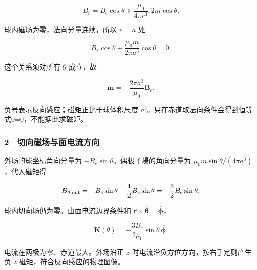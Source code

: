\documentclass[12pt,a4paper,fontset=fandol]{ctexart}
\begin{document}
\[B_r=B_e\cos\theta+\frac{\mu_0}{4\pi r^3},2m\cos\theta.\]

球内磁场为零，法向分量连续，所以 \(r=a\) 处

\[B_e\cos\theta+\frac{\mu_0m}{2\pi a^3}\cos\theta=0.\]

这个关系须对所有 \(\theta\) 成立，故

\[\boxed{\boldsymbol m=-\frac{2\pi a^3}{\mu_0}\boldsymbol B_e.}\]

负号表示反向感应；磁矩正比于球体积尺度
\(a^3\)。只在赤道取法向条件会得到恒等式0=0，不能据此求磁矩。

\subsubsection{2　切向磁场与面电流方向}\label{ux5207ux5411ux78c1ux573aux4e0eux9762ux7535ux6d41ux65b9ux5411}

外场的球坐标角向分量为 \(-B_e\sin\theta\)。偶极子場的角向分量为
\(\mu_0m\sin\theta/(4\pi a^3)\)，代入磁矩得

\[B_{\theta,\rm out}=-B_e\sin\theta-\frac12B_e\sin\theta
=-\frac32B_e\sin\theta.\]

球内切向场仍为零。由面电流边界条件和
\(\hat{\boldsymbol r}\times\hat{\boldsymbol\theta}=\hat{\boldsymbol\phi}\)，

\[\boxed{\boldsymbol K(\theta)
=-\frac{3B_e}{2\mu_0}\sin\theta\,\hat{\boldsymbol\phi}.}\]

电流在两极为零、赤道最大。外场沿正 \(z\)
时电流沿负方位方向，按右手定则产生负 \(z\)
磁矩，符合反向感应的物理图像。

\begin{center}
\begin{minipage}{\linewidth}
\centering\begingroup{}
\ifdim\wd\diagrambox>.88\linewidth
\sbox{\diagrambox}{\resizebox{.88\linewidth}{!}{\usebox{\diagrambox}}}\fi
\ifdim\ht\diagrambox>.38\textheight
\resizebox{!}{.38\textheight}{\usebox{\diagrambox}}
\else\usebox{\diagrambox}\fi
\par{}\endgroup\end{minipage}\end{center}
\end{document}
